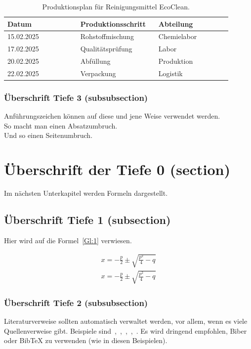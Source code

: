         \begin{table}[!htbp]
            \centering
            \begin{tabular}{| p{0.3\linewidth} | p{0.3\linewidth} | p{0.3\linewidth} |}\hline
            Datum & Produktionsschritt & Abteilung\\\hline
            15.02.2025 & Rohstoffmischung & Chemielabor\\
            17.02.2025 & Qualitätsprüfung & Labor\\
            20.02.2025 & Abfüllung & Produktion\\
            22.02.2025 & Verpackung & Logistik\\\hline
            \end{tabular}
            \caption{Produktionsplan für Reinigungsmittel \glqq{} EcoClean\grqq{}.}\label{tab:1}
        \end{table}



        
        \subsubsection{Überschrift Tiefe 3 (subsubsection)}
        Anführungszeichen können auf \glq{}diese\grq{} und \glqq{}jene\grqq{} Weise verwendet werden.\\

        So macht man einen Absatzumbruch.\\
        Und so einen Seitenumbruch.\clearpage


\section{Überschrift der Tiefe 0 (section)}
Im nächsten Unterkapitel werden Formeln dargestellt.


    \subsection{Überschrift Tiefe 1 (subsection)}
    Hier wird auf die Formel~\ref{Gl:1} verwiesen.

    \begin{align}
        x = -\frac{p}{2}\pm\sqrt{\frac{p^2}{4}-q}\label{Gl:1}
    \end{align}
    \begin{align}
        x = -\frac{p}{2}\pm\sqrt{\frac{p^2}{4}-q}\label{Gl:2}
    \end{align}

        \subsubsection{Überschrift Tiefe 2 (subsubsection)}
        Literaturverweise sollten automatisch verwaltet werden, vor allem, wenn es viele Quellenverweise gibt. 
        Beispiele sind~\cite{Ko05a},~\cite{Ko05b},~\cite{MiGo05},~\cite{TeGo14},~\cite{HuHa07}.
        Es wird dringend empfohlen, Biber oder BibTeX zu verwenden (wie in diesen Beispielen).
        
